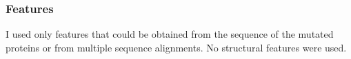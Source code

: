 \documentclass[10pt, british]{beamer}
\begin{document}
\begin{frame}
	\frametitle{Features}
	I used only features that could be obtained from the sequence of the mutated proteins or from multiple sequence alignments.
	No structural features were used.
	\vfill%
	\centering%
	\begin{figure}
		
	\end{figure}
\end{frame}
%
%
%	
%
%	
\end{document}
